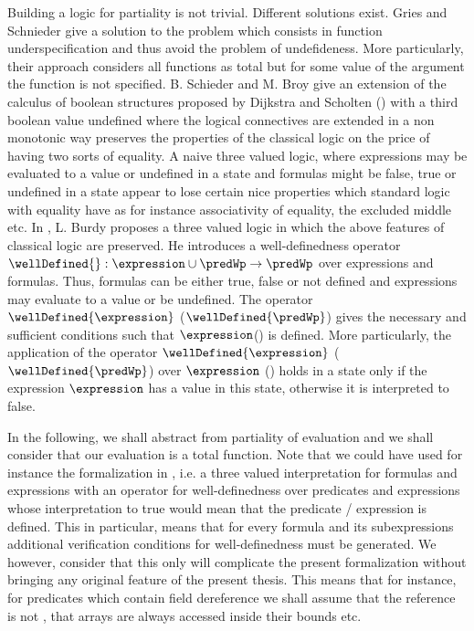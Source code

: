 Building a logic for partiality is not trivial. Different solutions exist. 
Gries and Schnieder \cite{gries95avoiding} give a solution to the problem which consists in function 
underspecification  and thus  avoid the problem of undefideness.
 More particularly, their approach considers all functions as total but for some value of the argument 
the function is not specified.  B. Schieder and M. Broy \cite{schieder99adapting} give 
  an extension  of the calculus of boolean structures proposed by Dijkstra and Scholten (\cite{WPCDS}) with a  third boolean value 
undefined where  the logical connectives are extended in a non monotonic way preserves the properties of the classical logic
on the price  of having two sorts of equality.
A naive three valued logic, where expressions may be evaluated to a value or  undefined  in a state and
 formulas might be false, true or undefined in a state appear to lose certain nice properties
 which standard logic with equality have
as for instance associativity of equality, the excluded middle \cite{gries95avoiding} etc. 
In \cite{burdy98treatment}, L. Burdy proposes a three valued logic in which the above features of classical logic are preserved.
He introduces a well-definedness operator $\wellDefined{}: \expression \cup \predWp \rightarrow \predWp$
 over expressions and formulas. Thus, formulas can be either true, false or not defined and
expressions may evaluate to a value or be undefined. The operator  $\wellDefined{\expression}$ ($\wellDefined{\predWp}$) 
 gives the necessary and sufficient
 conditions such that $\expression$(\predWp ) is defined.
 More particularly, the application of the operator   $\wellDefined{\expression}$  ($\wellDefined{\predWp}$) over $\expression$  (\predWp ) 
 holds in a state only if the expression $\expression$ has  a value in this state, otherwise it is interpreted to false.

In the following, we shall abstract from partiality of evaluation and we shall consider that our evaluation is a total function. 
Note that we could have used for instance the formalization in \cite{burdy98treatment}, i.e. 
a three valued interpretation for formulas and expressions with an operator for well-definedness over predicates and expressions 
whose interpretation to true would mean that the predicate / expression is defined. This in particular, means that 
for every formula and its subexpressions additional verification conditions for well-definedness must be generated.
 We however, consider that this only will complicate 
the present formalization without bringing any original feature of the present thesis. 
This means that for instance, for predicates which contain field dereference  we shall assume that the reference is not \Mynull,
that arrays are always accessed inside their bounds etc. 

